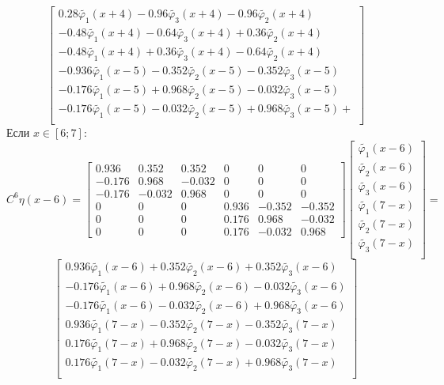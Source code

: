 \documentclass[a4paper, 12pt,fleqn]{extarticle}
\begin{document}
            \[
            \begin{bmatrix}
                0.28 \tilde{\varphi_1}(x+4) - 0.96 \tilde{\varphi_3}(x+4) - 0.96 \tilde{\varphi_2}(x+4) \\
                -0.48 \tilde{\varphi_1}(x+4) - 0.64 \tilde{\varphi_3}(x+4) + 0.36 \tilde{\varphi_2}(x+4) \\
                -0.48 \tilde{\varphi_1}(x+4) + 0.36 \tilde{\varphi_3}(x+4) - 0.64 \tilde{\varphi_2}(x+4) \\
                -0.936 \tilde{\varphi_1}(x-5) - 0.352 \tilde{\varphi_2}(x-5) - 0.352 \tilde{\varphi_3}(x-5) \\
                -0.176 \tilde{\varphi_1}(x-5) + 0.968 \tilde{\varphi_2}(x-5) - 0.032 \tilde{\varphi_3}(x-5) \\
                -0.176 \tilde{\varphi_1}(x-5) - 0.032 \tilde{\varphi_2}(x-5) + 0.968 \tilde{\varphi_3}(x-5) +\\
            \end{bmatrix}
            \]
            Если $x \in [6;7]$:
            \[C^6\eta(x-6)=
\begin{bmatrix}
    0.936 & 0.352 & 0.352 & 0 & 0 & 0\\
-0.176 & 0.968 & -0.032 & 0 & 0 & 0\\
-0.176 & -0.032 & 0.968 & 0 & 0 & 0\\
0 & 0 & 0 & 0.936 & -0.352 & -0.352\\
0 & 0 & 0 & 0.176 & 0.968 & -0.032\\
0 & 0 & 0 & 0.176 & -0.032 & 0.968
\end{bmatrix}
\begin{bmatrix}
    \tilde{\varphi_1}(x-6)\\%
    \tilde{\varphi_2}(x-6)\\%
    \tilde{\varphi_3}(x-6)\\%
    \tilde{\varphi_1}(7-x)\\%
    \tilde{\varphi_2}(7-x)\\%
    \tilde{\varphi_3}(7-x)\\%
\end{bmatrix}=\]
\[
\begin{bmatrix}
    0.936 \tilde{\varphi_1}(x-6) + 0.352 \tilde{\varphi_2}(x-6) + 0.352 \tilde{\varphi_3}(x-6)\\
    -0.176 \tilde{\varphi_1}(x-6) + 0.968 \tilde{\varphi_2}(x-6) - 0.032 \tilde{\varphi_3}(x-6) \\
    -0.176 \tilde{\varphi_1}(x-6) - 0.032 \tilde{\varphi_2}(x-6) + 0.968 \tilde{\varphi_3}(x-6) \\
    0.936 \tilde{\varphi_1}(7-x) - 0.352 \tilde{\varphi_2}(7-x) - 0.352 \tilde{\varphi_3}(7-x) \\
    0.176 \tilde{\varphi_1}(7-x) + 0.968 \tilde{\varphi_2}(7-x) - 0.032 \tilde{\varphi_3}(7-x) \\
0.176 \tilde{\varphi_1}(7-x) - 0.032 \tilde{\varphi_2}(7-x) + 0.968 \tilde{\varphi_3}(7-x) \\
\end{bmatrix}\]
\end{document}
